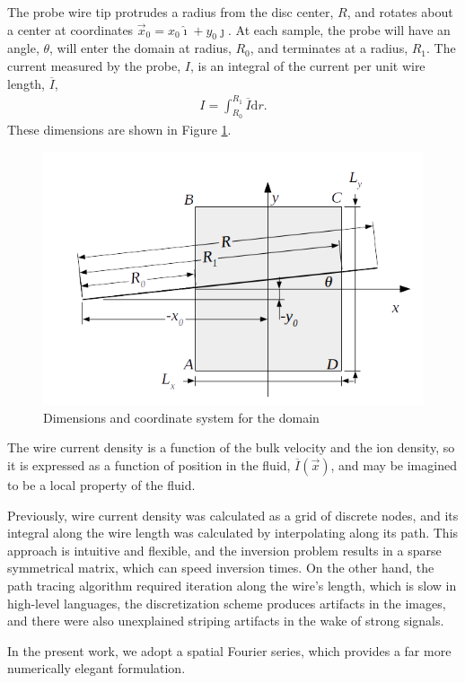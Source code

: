 \documentclass{article}
\def\I{\overline{I}}
\def\d{\mathrm{d}}
\def\x{\vec{x}}
\def\ui{\hat{\imath}}
\def\uj{\hat{\jmath}}
\begin{document}
The probe wire tip protrudes a radius from the disc center, $R$, and rotates about a center at coordinates $\vec{x}_0 = x_0\ui + y_0\uj$.  At each sample, the probe will have an angle, $\theta$, will enter the domain at radius, $R_0$, and terminates at a radius, $R_1$.  The current measured by the probe, $I$, is an integral of the current per unit wire length, $\I$,
\begin{align}
I = \int_{R_0}^{R_1} \I \d r.
\end{align}
These dimensions are shown in Figure \ref{fig:coords}.  
\begin{figure}
\centering
\includegraphics[width=.9\linewidth]{figures/coords}
\caption{Dimensions and coordinate system for the domain}\label{fig:coords}
\end{figure}

The wire current density is a function of the bulk velocity and the ion density, so it is expressed as a function of position in the fluid, $\I(\x)$, and may be imagined to be a local property of the fluid. 

Previously, wire current density was calculated as a grid of discrete nodes, and its integral along the wire length was calculated by interpolating along its path.  This approach is intuitive and flexible, and the inversion problem results in a sparse symmetrical matrix, which can speed inversion times.  On the other hand, the path tracing algorithm required iteration along the wire's length, which is slow in high-level languages, the discretization scheme produces artifacts in the images, and there were also unexplained striping artifacts in the wake of strong signals.

In the present work, we adopt a spatial Fourier series, which provides a far more numerically elegant formulation.
\end{document}
